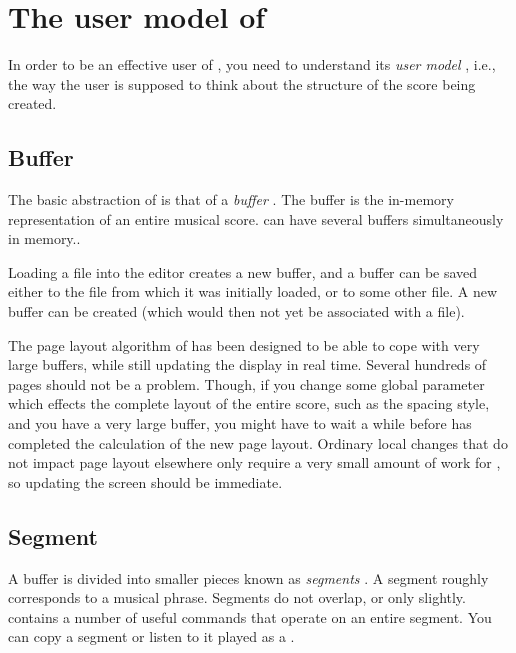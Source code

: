 \chapter{The user model of {\gs}}
\label{user-model}

In order to be an effective user of {\gs}, you need to understand its
\emph{user model} , i.e., the way the user is
supposed to think about the structure of the score being created.

\section{Buffer}
\label{model-buffer}

The basic abstraction of {\gs} is that of a \emph{buffer}
.  The buffer is the in-memory representation of an
entire musical score.  {\gs} can have several buffers simultaneously
in memory..  

Loading a {\gs} file into the editor creates a new buffer, and a
buffer can be saved either to the file from which it was initially
loaded, or to some other file.  A new buffer can be created (which
would then not yet be associated with a file).  

The page layout algorithm of {\gs} has been designed to be able to
cope with very large buffers, while still updating the display in real
time.  Several hundreds of pages should not be a problem.  Though, if
you change some global parameter which effects the complete layout of
the entire score, such as the spacing style, and you have a very large
buffer, you might have to wait a while before {\gs} has completed the
calculation of the new page layout.  Ordinary local changes that do
not impact page layout elsewhere only require a very small amount of
work for {\gs}, so updating the screen should be immediate. 

\section{Segment}
\label{model-segment}

A buffer is divided into smaller pieces known as \emph{segments}
.  A segment roughly corresponds to a musical phrase.
Segments do not overlap, or only slightly.  {\gs} contains a number of
useful commands that operate on an entire segment.  You can copy a
segment or listen to it played as a {\midifile}.

